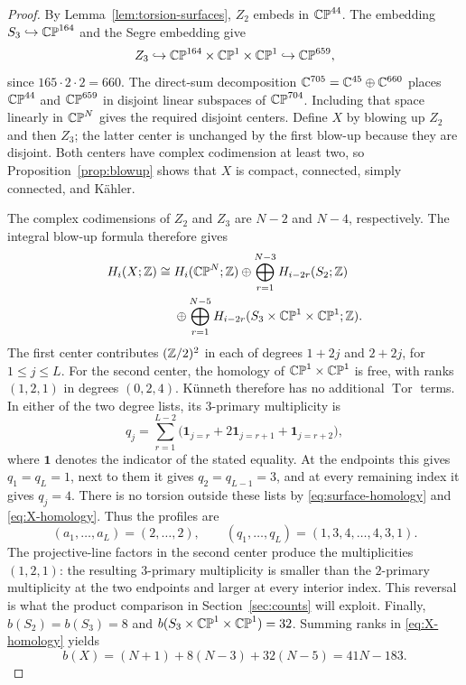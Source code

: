 \begin{proof}
By Lemma~\ref{lem:torsion-surfaces}, $Z_2$ embeds in $\mathbb{CP}^{44}$.
The embedding $S_3\hookrightarrow\mathbb{CP}^{164}$ and the Segre embedding
give
\[
 Z_3\hookrightarrow
 \mathbb{CP}^{164}\times\mathbb{CP}^1\times\mathbb{CP}^1
 \hookrightarrow\mathbb{CP}^{659},
\]
since $165\cdot2\cdot2=660$. The direct-sum decomposition
$\mathbb C^{705}=\mathbb C^{45}\oplus\mathbb C^{660}$ places $\mathbb{CP}^{44}$ and
$\mathbb{CP}^{659}$ in disjoint linear subspaces of $\mathbb{CP}^{704}$.
Including that space linearly in $\mathbb{CP}^N$ gives the required disjoint
centers. Define $X$ by blowing up $Z_2$ and then $Z_3$; the latter
center is unchanged by the first blow-up because they are disjoint.
Both centers have complex codimension at least two, so
Proposition~\ref{prop:blowup} shows that $X$ is compact, connected,
simply connected, and K\"ahler.

The complex codimensions of $Z_2$ and $Z_3$ are $N-2$ and $N-4$,
respectively. The integral blow-up formula therefore gives
\begin{equation}
\label{eq:X-homology}
\begin{split}
 H_i(X;\mathbb Z)\cong{}&H_i(\mathbb{CP}^N;\mathbb Z)
 \oplus\bigoplus_{r=1}^{N-3}H_{i-2r}(S_2;\mathbb Z)\\
 &\oplus\bigoplus_{r=1}^{N-5}
 H_{i-2r}(S_3\times\mathbb{CP}^1\times\mathbb{CP}^1;\mathbb Z).
\end{split}
\end{equation}
The first center contributes $(\mathbb Z/2)^2$ in each of degrees
$1+2j$ and $2+2j$, for $1\leq j\leq L$. For the second center,
the homology of $\mathbb{CP}^1\times\mathbb{CP}^1$ is free, with ranks $(1,2,1)$
in degrees $(0,2,4)$. K\"unneth therefore has no additional
$\operatorname{Tor}$ terms. In either of the two degree lists, its
$3$-primary multiplicity is
\[
 q_j=
 \sum_{r=1}^{L-2}
 \bigl(\mathbf 1_{j=r}+2\mathbf 1_{j=r+1}
                  +\mathbf 1_{j=r+2}\bigr),
\]
where $\mathbf 1$ denotes the indicator of the stated equality.
At the endpoints this gives $q_1=q_L=1$, next to them it gives
$q_2=q_{L-1}=3$, and at every remaining index it gives $q_j=4$.
There is no torsion outside these lists by
\eqref{eq:surface-homology} and \eqref{eq:X-homology}. Thus the
profiles are
\[
 (a_1,\ldots,a_L)=(2,\ldots,2),\qquad
 (q_1,\ldots,q_L)=(1,3,4,\ldots,4,3,1).
\]
The projective-line factors in the second center produce the multiplicities
$(1,2,1)$: the resulting $3$-primary multiplicity is smaller than the
$2$-primary multiplicity at the two endpoints and larger at every interior
index. This reversal is what the product comparison in Section~\ref{sec:counts}
will exploit.
Finally, $b(S_2)=b(S_3)=8$ and
$b(S_3\times\mathbb{CP}^1\times\mathbb{CP}^1)=32$. Summing ranks in
\eqref{eq:X-homology} yields
\[
 b(X)=(N+1)+8(N-3)+32(N-5)=41N-183.
\]
\end{proof}
